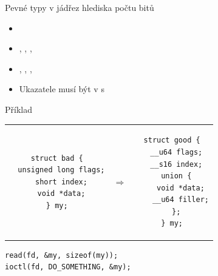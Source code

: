 \begin{frame}[fragile]{Pevné typy v jádře}{z hlediska počtu bitů}

  \begin{itemize}
    \item {}
    \item {}, , , 

    \pause

    \item {}, , , 

    \pause

    \item Ukazatele musí být v  s 
  \end{itemize}

  \pause

  \begin{block}{Příklad}
    \begin{center}
      \begin{tabular}{ccc}
	\begin{lstlisting}
struct bad {
  unsigned long flags;
  short index;
  void *data;
} my;
	\end{lstlisting} & $\Rightarrow$ &
	\begin{lstlisting}
struct good {
  __u64 flags;
  __s16 index;
  union {
    void *data;
    __u64 filler;
  };
} my;
	\end{lstlisting}
      \end{tabular}
    \end{center}

    \begin{lstlisting}[columns=fullflexible]
read(fd, &my, sizeof(my));
ioctl(fd, DO_SOMETHING, &my);
    \end{lstlisting}
  \end{block}

\end{frame}

